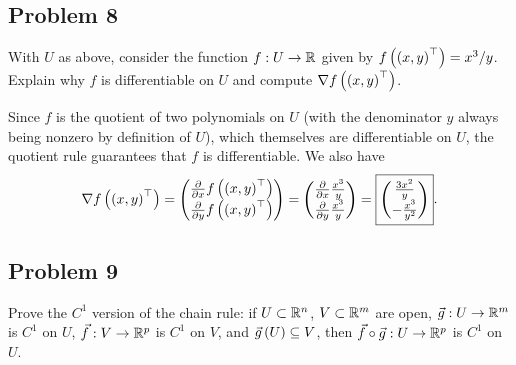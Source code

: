 \documentclass[main.tex]{subfiles}
\begin{document}
\subsection{Problem 8}
\begin{claim}
    With $U$ as above, consider the function $f : U \to \mathbb R$ given by $f\left( \left( x,y \right)^\top \right) = x^3/y$. Explain why $f$ is differentiable on $U$ and compute $\nabla f\left( \left( x,y \right)^\top \right)$.
\end{claim}

\begin{soln}
    Since $f$ is the quotient of two polynomials on $U$ (with the denominator $y$ always being nonzero by definition of $U$), which themselves are differentiable on $U$, the quotient rule guarantees that $f$ is differentiable. We also have
    \[\nabla f\left( \left( x,y \right)^\top \right) = \begin{pmatrix}
        \pdv{}{x} f\left( \left( x, y \right)^\top \right) \\
        \pdv{}{y} f\left( \left( x, y \right)^\top \right)
    \end{pmatrix} = \begin{pmatrix}
        \pdv{}{x} \frac{x^3}{y} \\
        \pdv{}{y} \frac{x^3}{y}
    \end{pmatrix} = \boxed{\begin{pmatrix}
        \frac{3x^2}{y} \\
        -\frac{x^3}{y^2}
    \end{pmatrix}}.\]
\end{soln}
\eject

\subsection{Problem 9}
\begin{claim}
    Prove the $C^1$ version of the chain rule: if $U \subset \mathbb R^n$, $V \subset \mathbb R^m$ are open, $\vec{g} : U \to \mathbb R^m$ is $C^1$ on $U$, $\vec{f} : V \to \mathbb R^p$ is $C^1$ on $V$, and $\vec{g}\left( U \right) \subseteq V$, then $\vec{f} \circ \vec{g} : U \to \mathbb R^p$ is $C^1$ on $U$.
\end{claim}
\end{document}
